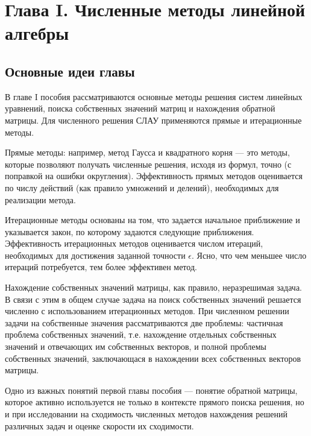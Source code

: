 \newpage
{}
\pagestyle{empty}
\vspace{0.5cm}


\section*{Глава I. Численные методы линейной алгебры}

\subsection{Основные идеи главы}

В главе I пособия рассматриваются основные методы решения систем линейных уравнений, поиска собственных значений матриц и нахождения обратной матрицы. Для численного решения СЛАУ применяются прямые и итерационные методы.

Прямые методы: например, метод Гаусса и квадратного корня — это методы, которые позволяют получать численные решения, исходя из формул, точно (с поправкой на ошибки округления). Эффективность прямых методов оценивается по числу действий (как правило умножений и делений), необходимых для реализации метода.

Итерационные методы основаны на том, что задается начальное приближение и указывается закон, по которому задаются следующие приближения. Эффективность итерационных методов оценивается числом итераций, необходимых для достижения заданной точности \begin{math} \epsilon \end{math}. Ясно, что чем меньшее число итераций потребуется, тем более эффективен метод.

Нахождение собственных значений матрицы, как правило, неразрешимая задача. В связи с этим в общем случае задача на поиск собственных значений решается численно с использованием итерационных методов. При численном решении задачи на собственные значения рассматриваются две проблемы: частичная проблема собственных значений, т.е. нахождение отдельных собственных значений и отвечающих им собственных векторов, и полной проблемы собственных значений, заключающася в нахождении всех собственных векторов матрицы.

Одно из важных понятий первой главы пособия — понятие обратной матрицы, которое активно используется не только в контексте прямого поиска решения, но и при исследовании на сходимость численных методов нахождения решений различных задач и оценке скорости их сходимости.

